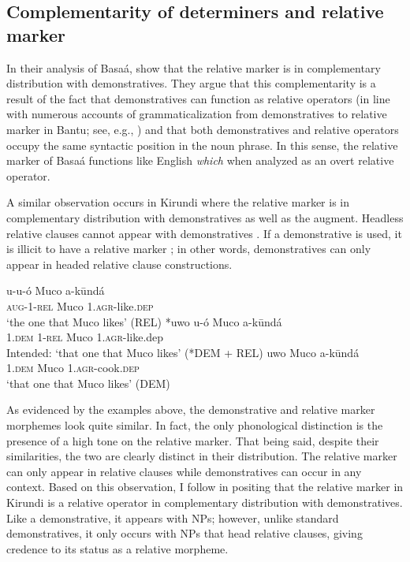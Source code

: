 \documentclass[output=paper,colorlinks,citecolor=brown
]{langscibook}
\begin{document}
\subsection{Complementarity of determiners and relative marker} \label{sec:myers:complementarity}

In their analysis of Basaá, \citet{Jenksetal:2017} show that the relative marker is in complementary distribution with demonstratives. They argue that this complementarity is a result of the fact that demonstratives can function as relative operators (in line with numerous accounts of grammaticalization from demonstratives to relative marker in Bantu; see, e.g., \citealt{Diessel:1999,HeineKuteva:2002}) and that both demonstratives and relative operators occupy the same syntactic position in the noun phrase. In this sense, the relative marker of Basaá functions like English \emph{which} when analyzed as an overt relative operator. 

A similar observation occurs in Kirundi where the relative marker is in complementary distribution with demonstratives as well as the augment. Headless relative clauses cannot appear with demonstratives . If a demonstrative is used, it is illicit to have a relative marker ; in other words, demonstratives can only appear in headed relative clause constructions.

 \ea
 \begin{xlist}
 \ex \label{ex:myers:hrca} \gll {}u-u-ó Muco a-kūndá\\
 \textsc{aug}-1-\textsc{rel} Muco 1.\textsc{agr}-like.\textsc{dep}\\
\glt  {}`the one that Muco likes' \hfill{(REL)}
 \ex \label{ex:myers:dem1} \gll {}*uwo u-ó Muco a-kūndá\\
 \textsc{1.dem} 1-\textsc{rel} Muco 1.\textsc{agr}-like.{dep}\\
\glt  {}Intended: `that one that Muco likes' \hfill{(*DEM + REL)}
\ex \label{ex:myers:dem2} \gll {}uwo Muco a-kūndá\\
 \textsc{1.dem} Muco 1.\textsc{agr}-cook.\textsc{dep}\\
\glt  {}`that one that Muco likes' \hfill{(DEM)}
\end{xlist}
\z


As evidenced by the examples above, the demonstrative and relative marker morphemes look quite similar. In fact, the only phonological distinction is the presence of a high tone on the relative marker. That being said, despite their similarities, the two are clearly distinct in their distribution. The relative marker can only appear in relative clauses while demonstratives can occur in any context. Based on this observation, I follow \citet{Jenksetal:2017} in positing that the relative marker in Kirundi is a relative operator in complementary distribution with demonstratives. Like a demonstrative, it appears with NPs; however, unlike standard demonstratives, it only occurs with NPs that head relative clauses, giving credence to its status as a relative morpheme.
\end{document}
